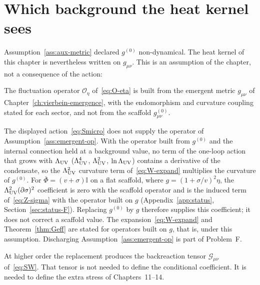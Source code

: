 \section{Which background the heat kernel sees}
\label{sec:ch8-which-g}

Assumption~\ref{ass:aux-metric} declared \(g^{(0)}\) non-dynamical.
The heat kernel of this chapter is nevertheless written on
\(g_{\mu\nu}\). This is an assumption of the chapter, not a consequence of the action:

\begin{assumption}
  \label{ass:emergent-op}
  The fluctuation operator \(\mathcal{O}_\eta\) of~\eqref{eq:O-eta} is
  built from the emergent metric \(g_{\mu\nu}\) of
  Chapter~\ref{ch:vierbein-emergence}, with the endomorphism and
  curvature coupling stated for each sector, and not from the scaffold
  \(g^{(0)}_{\mu\nu}\).
\end{assumption}

\begin{remark}
  \label{rem:ch8-scaffold-vs-emergent}
  The displayed action~\eqref{eq:Smicro} does not supply the operator
  of Assumption~\ref{ass:emergent-op}. With the operator built from
  \(g^{(0)}\) and the internal connection held at a background value,
  no term of the one-loop action that grows with \(\Lambda_{\mathrm{UV}}\)
  (\(\Lambda_{\mathrm{UV}}^4\), \(\Lambda_{\mathrm{UV}}^2\), \(\ln\Lambda_{\mathrm{UV}}\)) contains a derivative of the
  condensate, so the \(\Lambda_{\mathrm{UV}}^2\) curvature term
  of~\eqref{eq:W-expand} multiplies the curvature of \(g^{(0)}\). For
  \(\bar\Phi=(v+\sigma)\mathbb I\) on a flat scaffold, where
  \(g=(1+\sigma/v)^2\eta\), the \(\Lambda_{\mathrm{UV}}^2(\partial\sigma)^2\) coefficient
  is zero with the scaffold operator and is the induced term
  of~\eqref{eq:Z-sigma} with the operator built on \(g\)
  (Appendix~\ref{app:status}, Section~\ref{sec:status-F}). Replacing
  \(g^{(0)}\) by \(g\) therefore supplies this coefficient; it does not
  correct a scaffold value. The expansion~\eqref{eq:W-expand} and
  Theorem~\ref{thm:Geff} are stated for operators built on \(g\), that
  is, under this assumption. Discharging
  Assumption~\ref{ass:emergent-op} is part of Problem~F.
\end{remark}

At higher order the replacement produces the backreaction tensor
\(\mathcal{G}_{\mu\nu}\) of~\eqref{eq:SW}. That tensor is not needed
to define the conditional coefficient. It is needed to define the extra stress of
Chapters~11--14.

